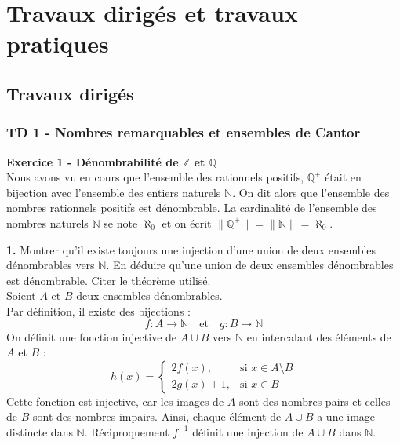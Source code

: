 \chapter{Travaux dirig\'es et travaux pratiques}\label{chap:td_tp}

    \section{Travaux dirig\'es}\label{sec:exos}
    \subsection{TD 1 - Nombres remarquables et ensembles de Cantor}\label{td_1}
    \hspace*{-2.65cm}\textbf{Exercice 1 - Dénombrabilité de \(\mathbb{Z}\) et \(\mathbb{Q}\)}\\
    Nous avons vu en cours que l'ensemble des rationnels positifs, \(\mathbb{Q^+}\) était en bijection avec l'ensemble des entiers naturels \(\mathbb{N}\). On dit alors que l'ensemble des nombres rationnels positifs est dénombrable. La cardinalité de l'ensemble des nombres naturels \(\mathbb{N}\) se note \(\aleph_0\) et on écrit \(\|\mathbb{Q^+}\|=\|\mathbb{N}\|=\aleph_0\).\par

    
    \hspace*{-1.5em}\textbf{1.} Montrer qu'il existe toujours une injection d'une union de deux ensembles dénombrables vers \(\mathbb{N}\). En déduire qu'une union de deux ensembles dénombrables est dénombrable. Citer le théorème utilisé.\\
    \headrule
    Soient \( A \) et \( B \) deux ensembles dénombrables.\\
    Par d\'efinition, il existe des bijections :  
    \begin{equation}
        f: A \to \mathbb{N} \quad \text{et} \quad g: B \to \mathbb{N}
    \end{equation}
    On d\'efinit une fonction injective de \( A \cup B \) vers \( \mathbb{N} \) en intercalant des \'el\'ements de \( A \) et \( B \) :
    \begin{equation}
        h(x) =
        \begin{cases}
            2f(x), & \text{si } x \in A \setminus B\\
            2g(x) + 1, & \text{si } x \in B
        \end{cases}
    \end{equation}
    Cette fonction est injective, car les images de \( A \) sont des nombres pairs et celles de \( B \) sont des nombres impairs. Ainsi, chaque \'el\'ement de \( A \cup B \) a une image distincte dans \( \mathbb{N} \).
    Réciproquement \(f^{-1}\) définit une injection de \(A\cup B\) dans \(\mathbb{N}\).


